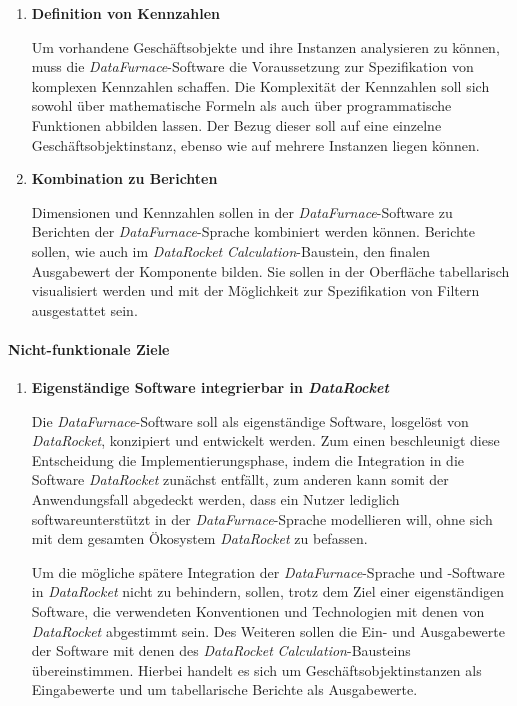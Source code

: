 \documentclass[
  language=german, %
  type=bachelor%
]{isthesis}
\begin{document}
\begin{content}
\begin{enumerate}
    \item \textbf{Definition von Kennzahlen}

      Um vorhandene Geschäftsobjekte und ihre Instanzen analysieren zu können,
      muss die \textit{DataFurnace}-Software die Voraussetzung zur
      Spezifikation von komplexen Kennzahlen schaffen. Die Komplexität der
      Kennzahlen soll sich sowohl über mathematische Formeln als auch
      über programmatische Funktionen abbilden lassen. Der Bezug dieser soll auf
      eine einzelne Geschäftsobjektinstanz, ebenso wie auf mehrere Instanzen
      liegen können.

    \item \textbf{Kombination zu Berichten}

      Dimensionen und Kennzahlen sollen in der \textit{DataFurnace}-Software zu
      Berichten der \textit{DataFurnace}-Sprache kombiniert werden können.
      Berichte sollen, wie auch im \textit{DataRocket}
      \textit{Calculation}-Baustein, den finalen Ausgabewert der Komponente
      bilden. Sie sollen in der Oberfläche tabellarisch visualisiert werden und
      mit der Möglichkeit zur Spezifikation von Filtern ausgestattet sein.

  \end{enumerate}

  \paragraph{Nicht-funktionale Ziele}
  \begin{enumerate}

    \item \textbf{Eigenständige Software integrierbar in \textit{DataRocket}}

      Die \textit{DataFurnace}-Software soll als eigenständige Software,
      losgelöst von \textit{DataRocket}, konzipiert und entwickelt werden. Zum
      einen beschleunigt diese Entscheidung die Implementierungsphase, indem
      die Integration in die Software \textit{DataRocket} zunächst entfällt,
      zum anderen kann somit der Anwendungsfall abgedeckt werden, dass ein Nutzer
      lediglich softwareunterstützt in der \textit{DataFurnace}-Sprache
      modellieren will, ohne sich mit dem gesamten Ökosystem
      \textit{DataRocket} zu befassen.

      Um die mögliche spätere Integration der \textit{DataFurnace}-Sprache und
      -Software in \textit{DataRocket} nicht zu behindern, sollen, trotz dem
      Ziel einer eigenständigen Software, die verwendeten Konventionen und
      Technologien mit denen von \textit{DataRocket} abgestimmt sein.  Des
      Weiteren sollen die Ein- und Ausgabewerte der Software mit denen des
      \textit{DataRocket} \textit{Calculation}-Bausteins übereinstimmen.
      Hierbei handelt es sich um Geschäftsobjektinstanzen als Eingabewerte und
      um tabellarische Berichte als Ausgabewerte.


\end{enumerate}
\end{content}
\end{document}
